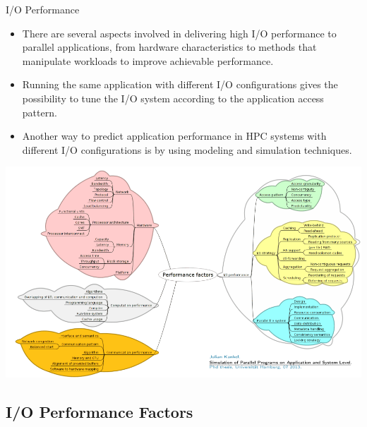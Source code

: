 \documentclass[compress,11pt,xcolor=svgnames,aspectratio=169]{beamer}
\begin{document}
\begin{frame}[fragile]{I/O Performance}

\begin{itemize}
\setlength\itemsep{0.8cm}

  \item There are several aspects involved in delivering high I/O performance to parallel applications, from hardware characteristics to methods that manipulate workloads to improve achievable performance.

  \item Running the same application with different I/O configurations gives the possibility to tune the I/O system according to the application access pattern.

  \item Another way to predict application performance in HPC systems with different I/O configurations is by using modeling and simulation techniques.

\end{itemize}

\nocite{SOPPOAASLK13}

\end{frame}

\begin{frame}[fragile]{}

\begin{center}
\includegraphics[scale=0.5]{fig/tree-perf}
\end{center}

\nocite{SOPPOAASLK13}

\end{frame}

\subsection{I/O Performance Factors}
\end{document}
